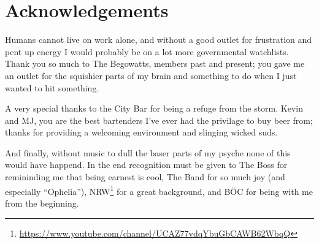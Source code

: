 \chapter{Acknowledgements}

Humans cannot live on work alone, and without a good outlet for frustration and pent up energy I would probably be on a lot more governmental watchlists. Thank you so much to The Begowatts, members past and present; you gave me an outlet for the squishier parts of my brain and something to do when I just wanted to hit something.

A very special thanks to the City Bar for being a refuge from the storm. Kevin and MJ, you are the best bartenders I've ever had the privilage to buy beer from; thanks for providing a welcoming environment and slinging wicked suds.

And finally, without music to dull the baser parts of my psyche none of this would have happend. In the end recognition must be given to The Boss for remininding me that being earnest is cool, The Band for so much joy (and especially ``Ophelia''), NRW\footnote{\url{https://www.youtube.com/channel/UCAZ77vdqYbuGbCAWB62WbqQ}} for a great background, and B{\"O}C for being with me from the beginning.

